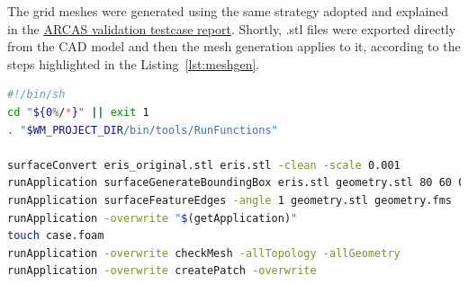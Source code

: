 \documentclass[12pt]{article}
\begin{document}
%
\noindent The grid meshes were generated using the same strategy adopted and explained in the \href{https://www.overleaf.com/read/ghcdhphkgfxf#df14d5}{ARCAS validation testcase report}. Shortly, .stl files were exported directly from the CAD model and then the mesh generation applies to it, according to the steps highlighted in the Listing~\ref{lst:meshgen}.
%
\begin{lstlisting}[caption=Mesh generation script., label=lst:meshgen, language=Bash]
#!/bin/sh
cd "${0%/*}" || exit 1 
. "$WM_PROJECT_DIR/bin/tools/RunFunctions"

surfaceConvert eris_original.stl eris.stl -clean -scale 0.001
runApplication surfaceGenerateBoundingBox eris.stl geometry.stl 80 60 0 40 40 40
runApplication surfaceFeatureEdges -angle 1 geometry.stl geometry.fms
runApplication -overwrite "$(getApplication)"
touch case.foam
runApplication -overwrite checkMesh -allTopology -allGeometry
runApplication -overwrite createPatch -overwrite
\end{lstlisting}
\end{document}

